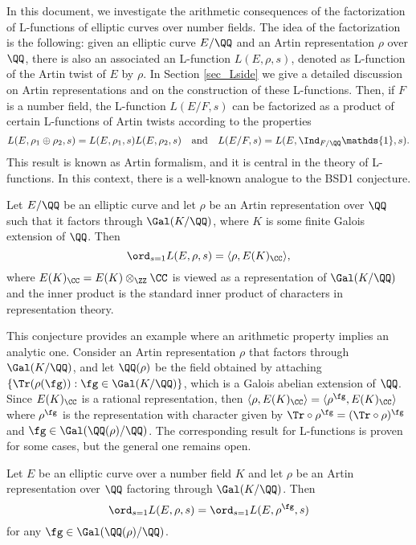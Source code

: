 In this document, we investigate the arithmetic consequences of the factorization of L-functions of elliptic curves over number fields. The idea of the factorization is the following: given an elliptic curve $E/\QQ$ and an Artin representation $\rho$ over $\QQ$, there is also an associated an L-function $L(E,\rho,s)$, denoted as L-function of the Artin twist of $E$ by $\rho$. In Section \ref{sec_Lside} we give a detailed discussion on Artin representations and on the construction of these L-functions. Then, if $F$ is a number field, the L-function $L(E/F,s)$ can be factorized as a product of certain L-functions of Artin twists according to the properties
$$L(E,\rho_1\oplus\rho_2,s)=L(E,\rho_1,s)L(E,\rho_2,s)\quad\text{and}\quad L(E/F,s)=L(E,\Ind_{F/\QQ}\mathds{1},s).$$
This result is known as Artin formalism, and it is central in the theory of L-functions. In this context, there is a well-known analogue to the BSD1 conjecture. 

\begin{conj}\label{conj_BSD1Artin}
    Let $E/\QQ$ be an elliptic curve and let $\rho$ be an Artin representation over $\QQ$ such that it factors through $\Gal(K/\QQ)$, where $K$ is some finite Galois extension of $\QQ$. Then
    $$\ord_{s=1}L(E,\rho,s)=\langle\rho,E(K)_{\CC}\rangle,$$
    where $E(K)_{\CC}=E(K)\otimes_{\ZZ}\CC$ is viewed as a representation of $\Gal(K/\QQ)$ and the inner product is the standard inner product of characters in representation theory.
\end{conj}

This conjecture provides an example where an arithmetic property implies an analytic one. Consider an Artin representation $\rho$ that factors through $\Gal(K/\QQ)$, and let $\QQ(\rho)$ be the field obtained by attaching $\{\Tr(\rho(\fg)):\fg\in\Gal(K/\QQ)\}$, which is a Galois abelian extension of $\QQ$. Since $E(K)_{\CC}$ is a rational representation, then $\langle\rho,E(K)_{\CC}\rangle=\langle\rho^{\fg},E(K)_{\CC}\rangle$ where $\rho^{\fg}$ is the representation with character given by $\Tr\circ\rho^{\fg}=(\Tr\circ\rho)^{\fg}$ and $\fg\in\Gal(\QQ(\rho)/\QQ)$. The corresponding result for L-functions is proven for some cases, but the general one remains open.

\begin{conj}
    Let $E$ be an elliptic curve over a number field $K$ and let $\rho$ be an Artin representation over $\QQ$ factoring through $\Gal(K/\QQ)$. Then
    $$\ord_{s=1}L(E,\rho,s)=\ord_{s=1}L(E,\rho^{\fg},s)$$
    for any $\fg\in\Gal(\QQ(\rho)/\QQ)$.
\end{conj}

